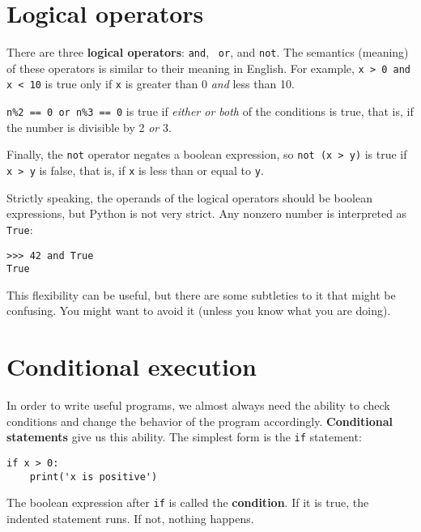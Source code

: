\section {Logical operators}

There are three {\bf logical operators}: {\tt and}, {\tt
or}, and {\tt not}.  The semantics (meaning) of these operators is
similar to their meaning in English.  For example,
{\tt x > 0 and x < 10} is true only if {\tt x} is greater than 0
{\em and} less than 10.

{\tt n\%2 == 0 or n\%3 == 0} is true if {\em either or both} of the
conditions is true, that is, if the number is divisible by 2 {\em or}
3.

Finally, the {\tt not} operator negates a boolean
expression, so {\tt not (x > y)} is true if {\tt x > y} is false,
that is, if {\tt x} is less than or equal to {\tt y}.

Strictly speaking, the operands of the logical operators should be
boolean expressions, but Python is not very strict.
Any nonzero number is interpreted as {\tt True}:

\begin{verbatim}
>>> 42 and True
True
\end{verbatim}
%
This flexibility can be useful, but there are some subtleties to
it that might be confusing.  You might want to avoid it (unless
you know what you are doing).


\section{Conditional execution}
\label{conditional.execution}

In order to write useful programs, we almost always need the ability
to check conditions and change the behavior of the program
accordingly.  {\bf Conditional statements} give us this ability.  The
simplest form is the {\tt if} statement:

\begin{verbatim}
if x > 0:
    print('x is positive')
\end{verbatim}
%
The boolean expression after {\tt if} is
called the {\bf condition}.  If it is true, the indented
statement runs.  If not, nothing happens.

